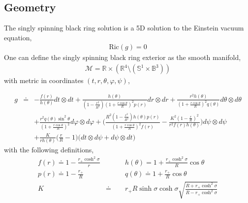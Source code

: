 \documentclass[11pt]{article}
\renewcommand{\phi}{\varphi}
\begin{document}
\subsection{Geometry}
 The singly spinning black ring solution is a 5D solution to the Einstein vacuum equation, 
\begin{eqnarray}
\mathrm{Ric}(g)=0
\end{eqnarray} 
One can define the singly spinning black ring exterior as the smooth manifold, 
 \begin{eqnarray}
 \mathcal{M}=\mathbb{R}\times(\mathbb{R}^4\setminus(\mathbb{S}^1\times \mathbb{B}^3))
 \end{eqnarray}
 with metric in coordinates $(t,r,\theta,\phi,\psi)$,
 \iffalse
 \begin{eqnarray}
 g\doteq\begin{pmatrix}
 -\frac{f(r)}{h(\theta)}&0&0&0&\frac{K}{rh(\theta)}\Big(\frac{r}{R}-1\Big)\\
 0&\frac{h(\theta)}{(1-\frac{r^2}{R^2})(1+\frac{r\cos\theta}{R})^2p(r)}&0&0&0\\
 0&0&\frac{r^2h(\theta)}{(1+\frac{r\cos\theta}{R})^2q(\theta)}&0&0\\
 0&0&0&\frac{r^2q(\theta)\sin^2\theta}{(1+\frac{r\cos\theta}{R})^2}&0\\
\frac{K}{rh(\theta)}\Big(\frac{r}{R}-1\Big) &0&0&0&\frac{R^2(1-\frac{r^2}{R^2})h(\theta)p(r)}{(1+\frac{r\cos\theta}{R})^2f(r)}-\frac{K^2(1-\frac{r}{R})^2}{r^2f(r)h(\theta)}
 \end{pmatrix}
 \end{eqnarray}
 \fi
 \begin{eqnarray}
 g&\doteq&-\frac{f(r)}{h(\theta)}dt\otimes dt+\frac{h(\theta)}{(1-\frac{r^2}{R^2})(1+\frac{r\cos\theta}{R})^2p(r)}dr\otimes dr+\frac{r^2h(\theta)}{(1+\frac{r\cos\theta}{R})^2q(\theta)}d\theta\otimes d\theta\\
 &&+\frac{r^2q(\theta)\sin^2\theta}{(1+\frac{r\cos\theta}{R})^2}d\phi\otimes d\phi+\Big(\frac{R^2(1-\frac{r^2}{R^2})h(\theta)p(r)}{(1+\frac{r\cos\theta}{R})^2f(r)}-\frac{K^2(1-\frac{r}{R})^2}{r^2f(r)h(\theta)}\Big)d\psi\otimes d\psi\nonumber\\
 &&+\frac{K}{rh(\theta)}\Big(\frac{r}{R}-1\Big)\big(dt\otimes d\psi+d\psi\otimes dt\big)\nonumber
 \end{eqnarray}
 with the following definitions, 
 \begin{eqnarray}
 f(r)\doteq1-\frac{r_+\cosh^2\sigma}{r}&\qquad& h(\theta)=1+\frac{r_+\cosh^2\sigma}{R}\cos\theta\\
 p(r)\doteq1-\frac{r_+}{R}&\qquad& q(\theta)\doteq1+\frac{r_+}{R}\cos\theta\\
 K&\doteq&r_+R\sinh\sigma\cosh\sigma\sqrt{\frac{R+r_+\cosh^2\sigma}{R-r_+\cosh^2\sigma}}
 \end{eqnarray}
\end{document}
